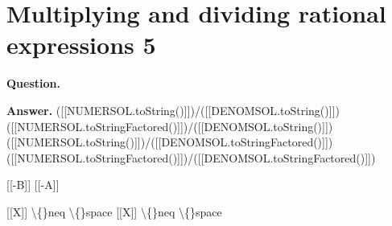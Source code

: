 \documentclass{article}
\begin{document}
\section*{Multiplying and dividing rational expressions 5}
\textbf{Question.} 

\textbf{Answer.} ([[NUMERSOL.toString()]])/([[DENOMSOL.toString()]])
                ([[NUMERSOL.toStringFactored()]])/([[DENOMSOL.toString()]])
                ([[NUMERSOL.toString()]])/([[DENOMSOL.toStringFactored()]])
                ([[NUMERSOL.toStringFactored()]])/([[DENOMSOL.toStringFactored()]])
            
            
                [[-B]]
                [[-A]]
                
                    [[X]] \textbackslash\{\}neq \textbackslash\{\}space
                    [[X]] \textbackslash\{\}neq \textbackslash\{\}space
\end{document}
